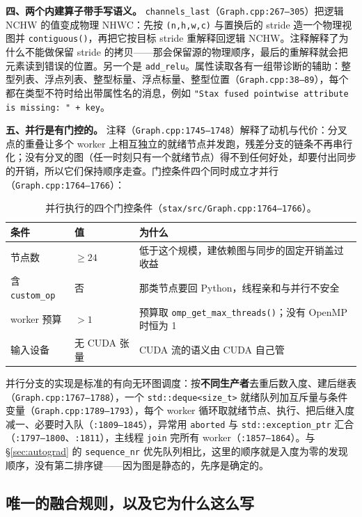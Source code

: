 \textbf{四、两个内建算子带手写语义。} \texttt{channels\_last}（\texttt{Graph.cpp:267--305}）把逻辑 NCHW 的值变成物理 NHWC：先按 \texttt{(n,h,w,c)} 与置换后的 stride 造一个物理视图并 \texttt{contiguous()}，再把它按目标 stride 重解释回逻辑 NCHW。注释解释了为什么不能做保留 stride 的拷贝——那会保留源的物理顺序，最后的重解释就会把元素读到错误的位置。另一个是 \texttt{add\_relu}。属性读取各有一组带诊断的辅助：整型列表、浮点列表、整型标量、浮点标量、整型位置（\texttt{Graph.cpp:38--89}），每个都在类型不符时给出带属性名的消息，例如 \texttt{"Stax fused pointwise attribute is missing: " + key}。

\textbf{五、并行是有门控的。} 注释（\texttt{Graph.cpp:1745--1748}）解释了动机与代价：分叉点的重叠让多个 worker 上相互独立的就绪节点并发跑，残差分支的链条不再串行化；没有分叉的图（任一时刻只有一个就绪节点）得不到任何好处，却要付出同步的开销，所以它们保持顺序走查。门控条件四个同时成立才并行（\texttt{Graph.cpp:1764--1766}）：

\begin{table}[H]
\centering
\caption{并行执行的四个门控条件（\texttt{stax/src/Graph.cpp:1764--1766}）。}
\label{tab:ng:gate}
\small
\begin{tabular}{lll}
\toprule
条件 & 值 & 为什么 \\
\midrule
节点数 & $\ge 24$ & 低于这个规模，建依赖图与同步的固定开销盖过收益 \\
含 \texttt{custom\_op} & 否 & 那类节点要回 Python，线程亲和与并行不安全 \\
worker 预算 & $> 1$ & 预算取 \texttt{omp\_get\_max\_threads()}；没有 OpenMP 时恒为 1 \\
输入设备 & 无 CUDA 张量 & CUDA 流的语义由 CUDA 自己管 \\
\bottomrule
\end{tabular}
\end{table}

并行分支的实现是标准的有向无环图调度：按\textbf{不同生产者}去重后数入度、建后继表（\texttt{Graph.cpp:1767--1788}），一个 \texttt{std::deque<size\_t>} 就绪队列加互斥量与条件变量（\texttt{Graph.cpp:1789--1793}），每个 worker 循环取就绪节点、执行、把后继入度减一、必要时入队（\texttt{:1809--1845}），异常用 \texttt{aborted} 与 \texttt{std::exception\_ptr} 汇合（\texttt{:1797--1800}、\texttt{:1811}），主线程 \texttt{join} 完所有 worker（\texttt{:1857--1864}）。与 \S\ref{sec:autograd} 的 \texttt{sequence\_nr} 优先队列相比，这里的顺序就是入度为零的发现顺序，没有第二排序键——因为图是静态的，先序是确定的。

\subsection{唯一的融合规则，以及它为什么这么写}


